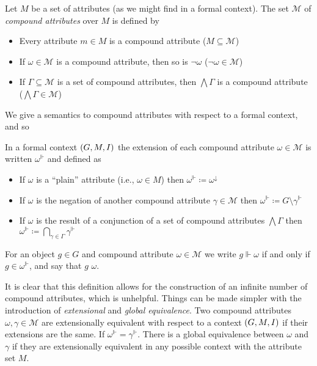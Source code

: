 \begin{definition}
  \label{definition:compound-attributes} Let $M$ be a set of attributes (as we might find in a formal context). The set $\mathcal{M}$ of
  \emph{compound attributes} over $M$ is defined by
  \begin{itemize}
    \item Every attribute $m \in M$ is a compound attribute \hfill ($M \subseteq \mathcal{M}$)

    \item If $\omega \in \mathcal{M}$ is a compound attribute, then so is $\neg \omega$ \hfill ($\neg \omega \in \mathcal{M}$)

    \item If $\Gamma \subseteq \mathcal{M}$ is a set of compound attributes, then $\bigwedge \Gamma$ is a compound attribute \hfill ($\bigwedge
      \Gamma \in \mathcal{M}$)
  \end{itemize}
\end{definition}

We give a semantics to compound attributes with respect to a formal context, and so

\begin{definition}
  \label{definition:compound-attributes-semantics} In a formal context $(G,M,\mathrel{I})$ the extension of each compound attribute $\omega \in \mathcal{M}$
  is written $\omega^{\Vdash}$ and defined as
  \begin{itemize}
    \item If $\omega$ is a ``plain'' attribute (i.e., $\omega \in M$) then $\omega^{\Vdash}\coloneq \omega^{\downarrow}$

    \item If $\omega$ is the negation of another compound attribute $\gamma \in \mathcal{M}$ then $\omega^{\Vdash}\coloneq G \setminus \gamma
      ^{\Vdash}$

    \item If $\omega$ is the result of a conjunction of a set of compound attributes $\bigwedge \Gamma$ then $\omega^{\Vdash}\coloneq \underset
      {\gamma \in \Gamma}\bigcap \gamma^{\Vdash}$
  \end{itemize}

  For an object $g\in G$ and compound attribute $\omega \in \mathcal{M}$ we write $g \Vdash \omega$ if and only if $g \in \omega^{\Vdash}$, and
  say that $g$  $\omega$.
\end{definition}

It is clear that this definition allows for the construction of an infinite number of compound attributes, which is unhelpful. Things can be
made simpler with the introduction of \textit{extensional} and \textit{global equivalence}. Two compound attributes
$\omega, \gamma \in \mathcal{M}$ are extensionally equivalent with respect to a context $(G,M,\mathrel{I})$ if their extensions are the same. If $\omega^{\Vdash}
= \gamma^{\Vdash}$. There is a global equivalence between $\omega$ and $\gamma$ if they are extensionally equivalent in any possible context
with the attribute set $M$.


